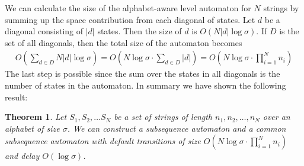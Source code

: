 \documentclass[a4paper,11pt]{article}
\newtheorem{theorem}{Theorem}
\begin{document}
 We can calculate the size of the alphabet-aware level automaton for $N$ strings by summing up the space contribution from each diagonal of states. Let $d$ be a diagonal consisting of $|d|$ states. Then the size of $d$ is $O(N|d| \log \sigma)$. If $D$ is the set of all diagonals, then the total size of the automaton becomes
\begin{gather*}
O\left (\sum_{d\in D} N|d|\log \sigma\right)=O\left (N \log \sigma \cdot \sum_{d\in D} |d|\right)= O \left (N \log \sigma \cdot \prod_{i=1}^N  n_i \right )
\end{gather*}
The last step is possible since the sum over the states in all diagonals is the number of states in the automaton. In summary we have shown the following result:
\begin{theorem}
Let $S_1,S_2, \ldots S_N$ be a set of strings of length $n_1,n_2, \ldots, n_N$ over an alphabet of size $\sigma$. We can construct a subsequence automaton and a common subsequence automaton with default transitions of size $O(N \log \sigma \cdot \prod_{i=1}^N n_i)$ and delay $O(\log \sigma)$.
\end{theorem}


















\end{document}
